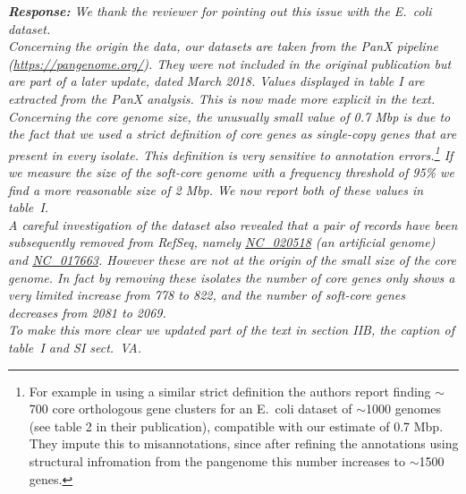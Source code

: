 \documentclass[aps,rmp,onecolumn]{revtex4-1}
\newcommand{\response}[1]{{\it {\color{response}\textbf{Response:} #1}}\vskip 5mm}
\newcommand{\SIdataBenchmark}{V}
\begin{document}
\response{
We thank the reviewer for pointing out this issue with the E.~coli dataset.\\

Concerning the origin the data, our datasets are taken from the PanX pipeline (\url{https://pangenome.org/}). They were not included in the original publication but are part of a later update, dated March 2018. Values displayed in table I are extracted from the PanX analysis. This is now made more explicit in the text.\\

Concerning the core genome size, the unusually small value of 0.7 Mbp is due to the fact that we used a strict definition of core genes as single-copy genes that are present in every isolate. This definition is very sensitive to annotation errors.\footnote{
      For example in \cite{sutton2021pan} using a similar strict definition the authors report finding $\sim$700 core orthologous gene clusters for an E.~coli dataset of $\sim$1000 genomes (see table 2 in their publication), compatible with our estimate of 0.7 Mbp. They impute this to misannotations, since after refining the annotations using structural infromation from the pangenome this number increases to $\sim$1500 genes.
} If we measure the size of the soft-core genome with a frequency threshold of 95\% we find a more reasonable size of 2 Mbp. We now report both of these values in table~I.\\
A careful investigation of the dataset also revealed that a pair of records have been subsequently removed from RefSeq, namely \href{https://www.ncbi.nlm.nih.gov/nuccore/NC_020518.1?report=genbank}{NC\_020518} (an artificial genome) and  \href{https://www.ncbi.nlm.nih.gov/nuccore/NC_017663.1?report=genbank}{NC\_017663}. However these are not at the origin of the small size of the core genome. In fact by removing these isolates the number of core genes only shows a very limited increase from 778 to 822, and the number of soft-core genes decreases from 2081 to 2069.\\

To make this more clear we updated part of the text in section IIB, the caption of table~I and SI sect.~{\SIdataBenchmark}A.
}
\end{document}
